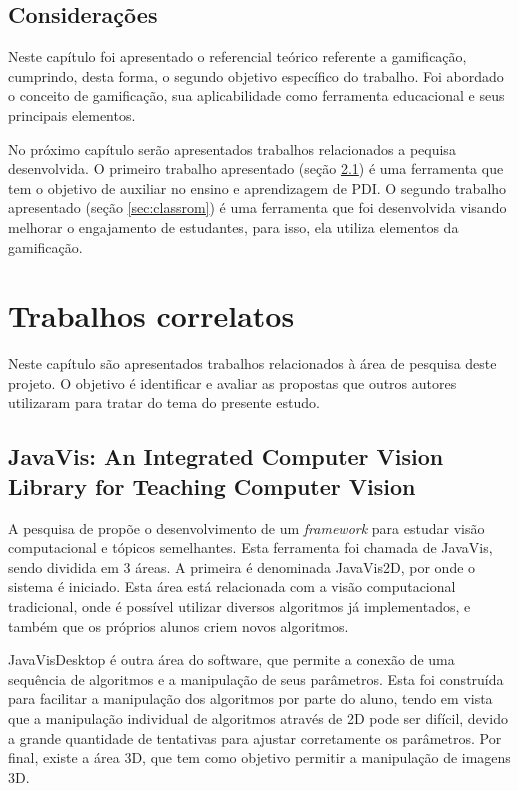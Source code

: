 \documentclass[
	12pt,				%
	oneside,			%
	a4paper,			%
	english,			%
	french,				%
	spanish,			%
	brazil,				%
	]{abntex2}
\begin{document}
\section{Considerações}

Neste capítulo foi apresentado o referencial teórico referente a gamificação, cumprindo, desta forma, o segundo objetivo específico do trabalho. Foi abordado o conceito de gamificação, sua aplicabilidade como ferramenta educacional e seus principais elementos.

No próximo capítulo serão apresentados trabalhos relacionados a pequisa desenvolvida. O primeiro trabalho apresentado (seção \ref{sec:javavis}) é uma ferramenta que tem o objetivo de auxiliar no ensino e aprendizagem de PDI. O segundo trabalho apresentado (seção \ref{sec:classrom}) é uma ferramenta que foi desenvolvida visando melhorar o engajamento de estudantes, para isso, ela utiliza elementos da gamificação.

\chapter{Trabalhos correlatos}
\label{sec:trabalhosCorrelatos}

Neste capítulo são apresentados trabalhos relacionados à área de pesquisa deste projeto. O objetivo é identificar e avaliar as propostas que outros autores utilizaram para tratar do tema do presente estudo.

\section{JavaVis: An Integrated Computer Vision Library for Teaching Computer Vision}
\label{sec:javavis}

A pesquisa de \citet{cazorla2015javavis} propõe o desenvolvimento de um \textit{framework} para estudar visão computacional e tópicos semelhantes. Esta ferramenta foi chamada de JavaVis, sendo  dividida em 3 áreas. A primeira é denominada JavaVis2D, por onde o sistema é iniciado. Esta área está relacionada com a visão computacional tradicional, onde é possível utilizar diversos algoritmos já implementados, e também que os próprios alunos criem novos algoritmos. 

JavaVisDesktop é outra área do software, que permite a conexão de uma sequência de algoritmos e a manipulação de seus parâmetros. Esta foi construída para facilitar a manipulação dos algoritmos por parte do aluno, tendo em vista que a manipulação individual de algoritmos através de 2D pode ser difícil, devido a grande quantidade de tentativas para ajustar corretamente os parâmetros. Por final, existe a área 3D, que tem como objetivo permitir a manipulação de imagens 3D.
\end{document}
